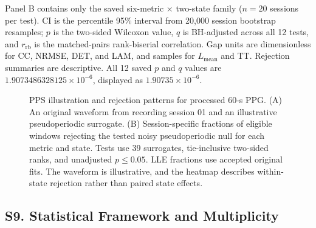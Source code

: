 \begin{table}[p]
\begin{tabular}{llrrrrrrr}
\bottomrule
\end{tabular}
\par\smallskip
\begin{minipage}{0.98\linewidth}
\footnotesize Panel B contains only the saved six-metric $\times$ two-state family ($n=20$ sessions per test). CI is the percentile 95\% interval from 20,000 session bootstrap resamples; $p$ is the two-sided Wilcoxon value, $q$ is BH-adjusted across all 12 tests, and $r_{\mathrm{rb}}$ is the matched-pairs rank-biserial correlation. Gap units are dimensionless for CC, NRMSE, DET, and LAM, and samples for $L_{\mathrm{mean}}$ and TT. Rejection summaries are descriptive. All 12 saved $p$ and $q$ values are $1.9073486328125\times10^{-6}$, displayed as $1.90735\times10^{-6}$.
\end{minipage}
\end{table}

\begin{figure}[p]
\centering
\caption{PPS illustration and rejection patterns for processed 60-s PPG. (A) An original waveform from recording session 01 and an illustrative pseudoperiodic surrogate. (B) Session-specific fractions of eligible windows rejecting the tested noisy pseudoperiodic null for each metric and state. Tests use 39 surrogates, tie-inclusive two-sided ranks, and unadjusted $p\leq0.05$. LLE fractions use accepted original fits. The waveform is illustrative, and the heatmap describes within-state rejection rather than paired state effects.}
\label{fig:supp_pps}
\end{figure}

\subsection*{S9. Statistical Framework and Multiplicity}

